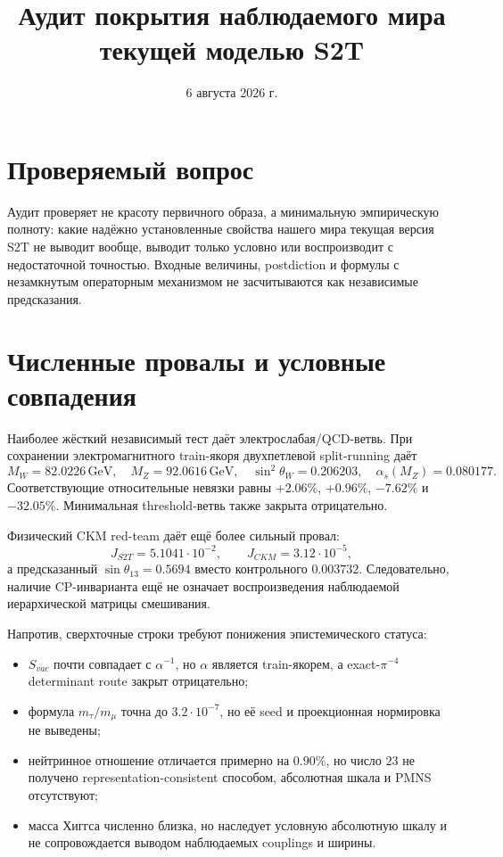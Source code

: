 \documentclass[12pt,a4paper]{article}
\title{Аудит покрытия наблюдаемого мира\\ текущей моделью S2T}
\author{}
\date{6 августа 2026 г.}
\begin{document}
\maketitle

\section{Проверяемый вопрос}

Аудит проверяет не красоту первичного образа, а минимальную эмпирическую
полноту: какие надёжно установленные свойства нашего мира текущая версия S2T
не выводит вообще, выводит только условно или воспроизводит с недостаточной
точностью. Входные величины, postdiction и формулы с незамкнутым операторным
механизмом не засчитываются как независимые предсказания.

\section{Численные провалы и условные совпадения}

Наиболее жёсткий независимый тест даёт электрослабая/QCD-ветвь. При сохранении
электромагнитного train-якоря двухпетлевой split-running даёт
\begin{equation}
 M_W=82.0226\,\mathrm{GeV},\quad
 M_Z=92.0616\,\mathrm{GeV},\quad
 \sin^2\theta_W=0.206203,\quad
 \alpha_s(M_Z)=0.080177.
\end{equation}
Соответствующие относительные невязки равны \(+2.06\%\), \(+0.96\%\),
\(-7.62\%\) и \(-32.05\%\). Минимальная threshold-ветвь также закрыта
отрицательно.

Физический CKM red-team даёт ещё более сильный провал:
\begin{equation}
 J_{S2T}=5.1041\cdot10^{-2},
 \qquad
 J_{CKM}=3.12\cdot10^{-5},
\end{equation}
а предсказанный \(\sin\theta_{13}=0.5694\) вместо контрольного \(0.003732\).
Следовательно, наличие CP-инварианта ещё не означает воспроизведения
наблюдаемой иерархической матрицы смешивания.

Напротив, сверхточные строки требуют понижения эпистемического статуса:
\begin{itemize}
 \item \(S_{vac}\) почти совпадает с \(\alpha^{-1}\), но \(\alpha\) является
 train-якорем, а exact-\(\pi^{-4}\) determinant route закрыт отрицательно;
 \item формула \(m_\tau/m_\mu\) точна до \(3.2\cdot10^{-7}\), но её seed и
 проекционная нормировка не выведены;
 \item нейтринное отношение отличается примерно на \(0.90\%\), но число
 \(23\) не получено representation-consistent способом, абсолютная шкала и
 PMNS отсутствуют;
 \item масса Хиггса численно близка, но наследует условную абсолютную шкалу и
 не сопровождается выводом наблюдаемых couplings и ширины.
\end{itemize}
\end{document}
